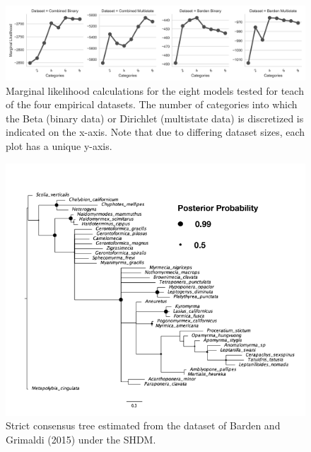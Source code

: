 \documentclass[]{sysbio}
\begin{document}
\begin{figure}
  \caption{Marginal likelihood calculations for the eight models tested for teach of the four empirical datasets. The number of categories into which the Beta (binary data) or Dirichlet (multistate data) is discretized is indicated on the x-axis. Note that due to differing dataset sizes, each plot has a unique y-axis.}
    \includegraphics[width=\textwidth]{fig/SS_plot_nostar}
\end{figure} 

\begin{figure}
  \caption{Strict consensus tree estimated from the dataset of Barden and Grimaldi (2015) under the SHDM. } 
    \includegraphics[scale=0.75]{fig/bartree}
\end{figure} 
\end{document}
